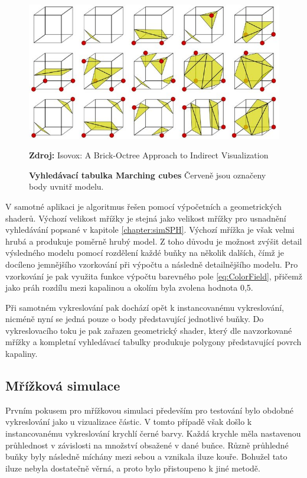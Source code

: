 \begin{figure}[hbt]
	\centering
	\captionsetup{justification=centering}
	\includegraphics[scale=0.5]{obrazky-figures/Look-up-table-for-the-Marching-Cubes-algorithm-13_W640.jpg}
	\caption{\textbf{Vyhledávací tabulka Marching cubes} Červeně jsou označeny body uvnitř modelu.}
	\textbf{Zdroj: } Isovox: A Brick-Octree Approach to Indirect Visualization \cite{isovox}
	\label{fig:EvapFlow}
\end{figure}

V samotné aplikaci je algoritmus řešen pomocí výpočetních a geometrických shaderů. Výchozí velikost mřížky je stejná jako velikost mřížky pro usnadnění vyhledávání popsané v kapitole \ref{chapter:simSPH}. Výchozí mřížka je však velmi hrubá a produkuje poměrně hrubý model. Z toho důvodu je možnost zvýšit detail výsledného modelu pomocí rozdělení každé buňky na několik dalších, čímž je docíleno jemnějšího vzorkování při výpočtu a následně detailnějšího modelu. Pro vzorkování je pak využita funkce výpočtu barevného pole \ref{eq:ColorField}, přičemž jako práh rozdílu mezi kapalinou a okolím byla zvolena hodnota 0,5.

Při samotném vykreslování pak dochází opět k instancovanému vykreslování, nicméně nyní se jedná pouze o body představující jednotlivé buňky. Do vykreslovacího toku je pak zařazen geometrický shader, který dle navzorkované mřížky a kompletní vyhledávací tabulky produkuje polygony představující povrch kapaliny.

\subsection{Mřížková simulace}
\label{chapter:vizGrid}
Prvním pokusem pro mřížkovou simulaci především pro testování bylo obdobné vykreslování jako u vizualizace částic. V tomto případě však došlo k instancovanému vykreslování krychlí černé barvy. Každá krychle měla nastavenou průhlednost v závislosti na množství obsažené v dané buňce. Různě průhledné buňky byly následně míchány mezi sebou a vznikala iluze kouře. Bohužel tato iluze nebyla dostatečně věrná, a proto bylo přistoupeno k jiné metodě.

